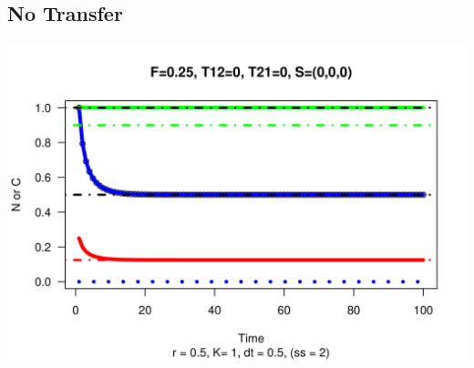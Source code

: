 \documentclass[a4paper,KOMA,landscape,titlepage]{powersem}
\begin{document}
\begin{slide}\section{No Transfer}
\begin{center}
\includegraphics[height=0.8\textheight]{./graphics/r05F025T120T210S000.png}
\end{center}
\end{slide}
\end{document}
